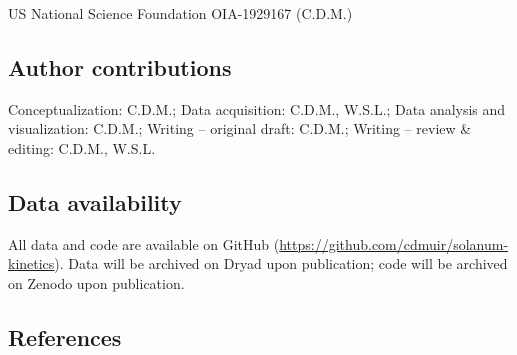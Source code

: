 \documentclass[
  letterpaper,
  DIV=11,
  numbers=noendperiod]{scrartcl}
\begin{document}
US National Science Foundation OIA-1929167 (C.D.M.)

\subsection{Author contributions}\label{author-contributions}

Conceptualization: C.D.M.; Data acquisition: C.D.M., W.S.L.; Data
analysis and visualization: C.D.M.; Writing -- original draft: C.D.M.;
Writing -- review \& editing: C.D.M., W.S.L.

\subsection{Data availability}\label{data-availability}

All data and code are available on GitHub
(\url{https://github.com/cdmuir/solanum-kinetics}). Data will be
archived on Dryad upon publication; code will be archived on Zenodo upon
publication.

\subsection{References}\label{references}

\singlespacing
\end{document}
